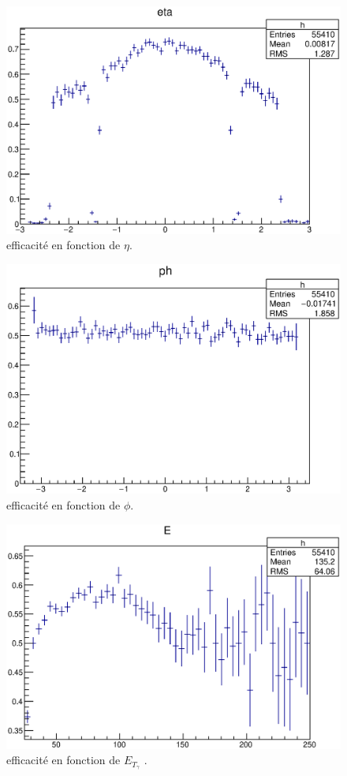 \documentclass[11pt]{article} %
\begin{document}
\begin{figure}[h!]
  \caption{efficacité en fonction de $\eta$.}
\includegraphics{../graphes/acceptance_eta_ph}
\end{figure}


\begin{figure}[h!]
  \caption{efficacité en fonction de $\phi$.}
\includegraphics{../graphes/acceptance_phi_ph}
\end{figure}

\begin{figure}[h!]
  \caption{efficacité en fonction de $E_{T_\gamma}$ .}
\includegraphics{../graphes/accep_et_raw}
\end{figure}
\end{document}
